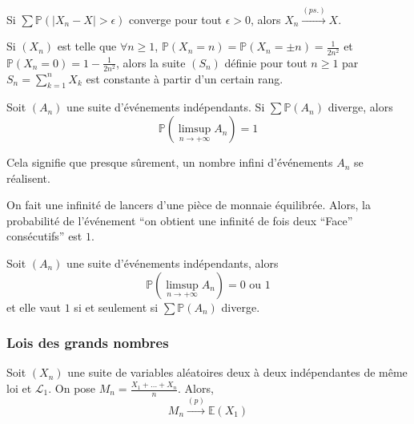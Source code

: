   \begin{corollary}
    Si $\sum \mathbb{P}(\vert X_n - X \vert > \epsilon)$ converge pour tout $\epsilon > 0$, alors $X_n \overset{(ps.)}{\longrightarrow} X$.
  \end{corollary}


  \begin{example}
    Si $(X_n)$ est telle que $\forall n \geq 1$, $\mathbb{P}(X_n = n) = \mathbb{P}(X_n = \pm n) = \frac{1}{2n^2}$ et $\mathbb{P}(X_n = 0) = 1 - \frac{1}{2n^2}$, alors la suite $(S_n)$ définie pour tout $n \geq 1$ par $S_n = \sum_{k=1}^n X_k$ est constante à partir d'un certain rang.
  \end{example}


  \begin{theorem}
    Soit $(A_n)$ une suite d'événements indépendants. Si $\sum \mathbb{P}(A_n)$ diverge, alors
    \[ \mathbb{P} \left( \limsup_{n \rightarrow +\infty} A_n \right) = 1 \]
  \end{theorem}

  \begin{remark}
    Cela signifie que presque sûrement, un nombre infini d'événements $A_n$ se réalisent.
  \end{remark}


  \begin{example}
    On fait une infinité de lancers d'une pièce de monnaie équilibrée. Alors, la probabilité de l'événement ``on obtient une infinité de fois deux ``Face'' consécutifs'' est $1$.
  \end{example}

  \begin{corollary}
    Soit $(A_n)$ une suite d'événements indépendants, alors
    \[ \mathbb{P} \left( \limsup_{n \rightarrow +\infty} A_n \right) = 0 \text{ ou } 1 \]
    et elle vaut $1$ si et seulement si $\sum \mathbb{P}(A_n)$ diverge.
  \end{corollary}

  \subsubsection{Lois des grands nombres}


  \begin{theorem}
    Soit $(X_n)$ une suite de variables aléatoires deux à deux indépendantes de même loi et $\mathcal{L}_1$. On pose $M_n = \frac{X_1 + \dots + X_n}{n}$. Alors,
    \[ M_n \overset{(p)}{\longrightarrow} \mathbb{E}(X_1) \]
  \end{theorem}

